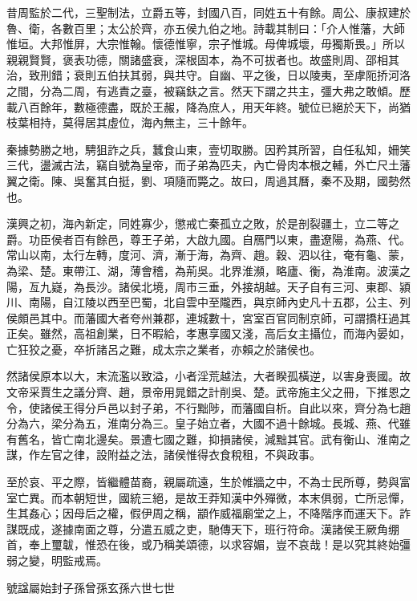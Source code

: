 
\begin{pinyinscope}
昔周監於二代，三聖制法，立爵五等，封國八百，同姓五十有餘。周公、康叔建於魯、衛，各數百里；太公於齊，亦五侯九伯之地。詩載其制曰：「介人惟藩，大師惟垣。大邦惟屏，大宗惟翰。懷德惟寧，宗子惟城。母俾城壞，毋獨斯畏。」所以親親賢賢，褒表功德，關諸盛衰，深根固本，為不可拔者也。故盛則周、邵相其治，致刑錯；衰則五伯扶其弱，與共守。自幽、平之後，日以陵夷，至虖阨挢河洛之間，分為二周，有逃責之臺，被竊鈇之言。然天下謂之共主，彊大弗之敢傾。歷載八百餘年，數極德盡，既於王赧，降為庶人，用天年終。號位已絕於天下，尚猶枝葉相持，莫得居其虛位，海內無主，三十餘年。

秦據勢勝之地，騁狙詐之兵，蠶食山東，壹切取勝。因矜其所習，自任私知，姍笑三代，盪滅古法，竊自號為皇帝，而子弟為匹夫，內亡骨肉本根之輔，外亡尺土藩翼之衛。陳、吳奮其白挺，劉、項隨而斃之。故曰，周過其曆，秦不及期，國勢然也。

漢興之初，海內新定，同姓寡少，懲戒亡秦孤立之敗，於是剖裂疆土，立二等之爵。功臣侯者百有餘邑，尊王子弟，大啟九國。自鴈門以東，盡遼陽，為燕、代。常山以南，太行左轉，度河、濟，漸于海，為齊、趙。穀、泗以往，奄有龜、蒙，為梁、楚。東帶江、湖，薄會稽，為荊吳。北界淮瀕，略廬、衡，為淮南。波漢之陽，亙九嶷，為長沙。諸侯北境，周市三垂，外接胡越。天子自有三河、東郡、潁川、南陽，自江陵以西至巴蜀，北自雲中至隴西，與京師內史凡十五郡，公主、列侯頗邑其中。而藩國大者夸州兼郡，連城數十，宮室百官同制京師，可謂撟枉過其正矣。雖然，高祖創業，日不暇給，孝惠享國又淺，高后女主攝位，而海內晏如，亡狂狡之憂，卒折諸呂之難，成太宗之業者，亦賴之於諸侯也。

然諸侯原本以大，末流濫以致溢，小者淫荒越法，大者睽孤橫逆，以害身喪國。故文帝采賈生之議分齊、趙，景帝用晁錯之計削吳、楚。武帝施主父之冊，下推恩之令，使諸侯王得分戶邑以封子弟，不行黜陟，而藩國自析。自此以來，齊分為七趙分為六，梁分為五，淮南分為三。皇子始立者，大國不過十餘城。長城、燕、代雖有舊名，皆亡南北邊矣。景遭七國之難，抑損諸侯，減黜其官。武有衡山、淮南之謀，作左官之律，設附益之法，諸侯惟得衣食稅租，不與政事。

至於哀、平之際，皆繼體苗裔，親屬疏遠，生於帷牆之中，不為士民所尊，勢與富室亡異。而本朝短世，國統三絕，是故王莽知漢中外殫微，本末俱弱，亡所忌憚，生其姦心；因母后之權，假伊周之稱，顓作威福廟堂之上，不降階序而運天下。詐謀既成，遂據南面之尊，分遣五威之吏，馳傳天下，班行符命。漢諸侯王厥角绷首，奉上璽韍，惟恐在後，或乃稱美頌德，以求容媚，豈不哀哉！是以究其終始彊弱之變，明監戒焉。

號諡屬始封子孫曾孫玄孫六世七世


\end{pinyinscope}